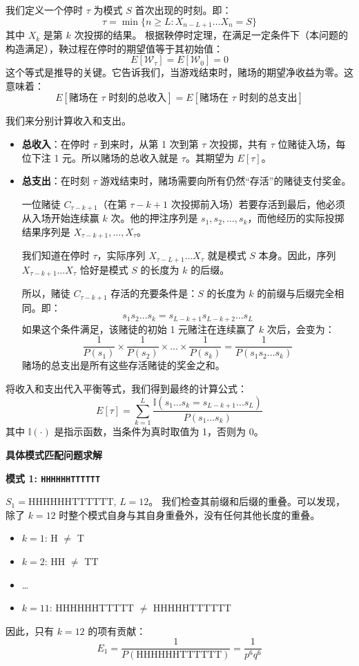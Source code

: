 \documentclass[UTF8]{ctexart}
\begin{document}
我们定义一个停时 $\tau$ 为模式 $S$ 首次出现的时刻。即：
$$ \tau = \min\{ n \ge L : X_{n-L+1} \dots X_n = S \} $$
其中 $X_k$ 是第 $k$ 次投掷的结果。
根据鞅停时定理，在满足一定条件下（本问题的构造满足），鞅过程在停时的期望值等于其初始值：
$$ E[\mathcal{W}_\tau] = E[\mathcal{W}_0] = 0 $$
这个等式是推导的关键。它告诉我们，当游戏结束时，赌场的期望净收益为零。这意味着：
$$ E[\text{赌场在 }\tau\text{ 时刻的总收入}] = E[\text{赌场在 }\tau\text{ 时刻的总支出}] $$

我们来分别计算收入和支出。
\begin{itemize}
    \item \textbf{总收入}：在停时 $\tau$ 到来时，从第 1 次到第 $\tau$ 次投掷，共有 $\tau$ 位赌徒入场，每位下注 1 元。所以赌场的总收入就是 $\tau$。其期望为 $E[\tau]$。
    \item \textbf{总支出}：在时刻 $\tau$ 游戏结束时，赌场需要向所有仍然“存活”的赌徒支付奖金。
    
    一位赌徒 $C_{\tau-k+1}$（在第 $\tau-k+1$ 次投掷前入场）若要存活到最后，他必须从入场开始连续赢 $k$ 次。他的押注序列是 $s_1, s_2, \dots, s_k$，而他经历的实际投掷结果序列是 $X_{\tau-k+1}, \dots, X_\tau$。
    
    我们知道在停时 $\tau$，实际序列 $X_{\tau-L+1} \dots X_\tau$ 就是模式 $S$ 本身。因此，序列 $X_{\tau-k+1} \dots X_\tau$ 恰好是模式 $S$ 的长度为 $k$ 的后缀。
    
    所以，赌徒 $C_{\tau-k+1}$ 存活的充要条件是：$S$ 的长度为 $k$ 的前缀与后缀完全相同。即：
    $$ s_1s_2\dots s_k = s_{L-k+1}s_{L-k+2}\dots s_L $$
    如果这个条件满足，该赌徒的初始 1 元赌注在连续赢了 $k$ 次后，会变为：
    $$ \frac{1}{P(s_1)} \times \frac{1}{P(s_2)} \times \dots \times \frac{1}{P(s_k)} = \frac{1}{P(s_1s_2\dots s_k)} $$
    赌场的总支出是所有这些存活赌徒的奖金之和。
\end{itemize}
将收入和支出代入平衡等式，我们得到最终的计算公式：
$$ E[\tau] = \sum_{k=1}^{L} \frac{\mathbb{I}(s_1\dots s_k = s_{L-k+1}\dots s_L)}{P(s_1\dots s_k)} $$
其中 $\mathbb{I}(\cdot)$ 是指示函数，当条件为真时取值为 1，否则为 0。

\textbf{具体模式匹配问题求解}

\textbf{模式 1: \texttt{HHHHHHTTTTTT}}

$S_1 = \text{HHHHHHTTTTTT}$, $L=12$。
我们检查其前缀和后缀的重叠。可以发现，除了 $k=12$ 时整个模式自身与其自身重叠外，没有任何其他长度的重叠。
\begin{itemize}
    \item $k=1$: H $\neq$ T
    \item $k=2$: HH $\neq$ TT
    \item \dots
    \item $k=11$: HHHHHHTTTTT $\neq$ HHHHHTTTTTT
\end{itemize}
因此，只有 $k=12$ 的项有贡献：
$$ E_1 = \frac{1}{P(\text{HHHHHHTTTTTT})} = \frac{1}{p^6q^6} $$
\end{document}
